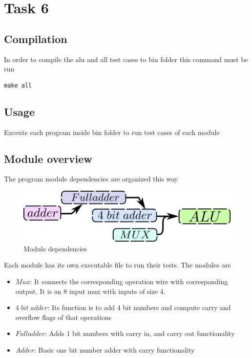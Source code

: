 
\usepackage{listings}



\section*{Task 6}

\subsection*{Compilation}
In order to compile the alu and all test cases to bin folder this command must be run
\begin{lstlisting}
make all
\end{lstlisting}

\subsection*{Usage}
Exceute each program inside bin folder to run test cases of each module

\subsection*{Module overview}
The program module dependencies are organized this way
\begin{figure}[H]
  \begin{centering}
  \includegraphics[scale=1]{data/modulos.png}
  \par\end{centering}
  \caption{Module dependencies}
\end{figure}
Each module has its own executable file to run their tests. The modules are

\begin{itemize}
  \item $Mux$: It connects the corresponding operation wire with corresponding output. It is an 8 input mux with inputs of size 4.
  \item $4\;bit\;adder$: Its function is to add 4 bit numbers and compute carry and overflow flags of that operations
  \item $Fulladder$: Adds 1 bit numbers with carry in, and carry out functionality
  \item $Adder $: Basic one bit number adder with carry functionality
\end{itemize}

